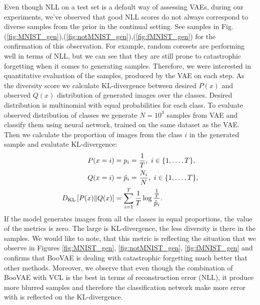 Even though NLL on a test set is a default way of assessing VAEs, during our experiments, we've observed that good NLL scores do not always correspond to diverse samples from the prior in the continual setting. See samples in Fig.(\ref{fig:MNIST_gen}),(\ref{fig:notMNIST_gen}),(\ref{fig:fMNIST_gen}) for the confirmation of this observation. For example, random coresets are performing well in terms of NLL, but we can see that they are still prone to catastrophic forgetting when it comes to generating samples. 
Therefore, we were interested in quantitative evaluation of the samples, produced by the VAE on each step. As the diversity score we calculate KL-divergence between desired $P(x)$ and observed $Q(x)$ distribution of generated images over the classes. Desired distribution is multinomial with equal probabilities for each class. To evaluate observed distribution of classes we generate $N = 10^3$ samples from VAE and classify them using neural network, trained on the same dataset as the VAE. Then we calculate the proportion of images from the class $i$ in the generated sample and evalutate KL-divergence:
\begin{equation}
\begin{aligned}
\setlength{\abovedisplayskip}{1pt}
\setlength{\belowdisplayskip}{1pt}
P(x=i) &= p_i = \frac{1}{T}, \,\, i \in \{1, \dots, T\}, \\
Q(x=i) &= \hat{p}_i = \frac{N_i}{N}, \,\, i \in \{1, \dots, T\},\\
\KL{P(x)}{Q(x)} &= \sum_{i=1}^T \frac{1}{T} \log\frac{\frac{1}{T}}{\hat{p}_i}.
\end{aligned}
\end{equation}
If the model generates images from all the classes in equal proportions, the value of the metrics is zero. The large is KL-divergence, the less diversity is there in the samples. We would like to note, that this metric is reflecting the situation that we observe in Figures \ref{fig:MNIST_gen}, \ref{fig:notMNIST_gen}, \ref{fig:fMNIST_gen} and confirms that BooVAE is dealing with catastrophic forgetting much better that other methods. Moreover, we observe that even though the combination of BooVAE with VCL is the best in terms of reconstruction error (NLL), it produce more blurred samples and therefore the classification network make more error with is reflected on the KL-divergence.

\newpage
